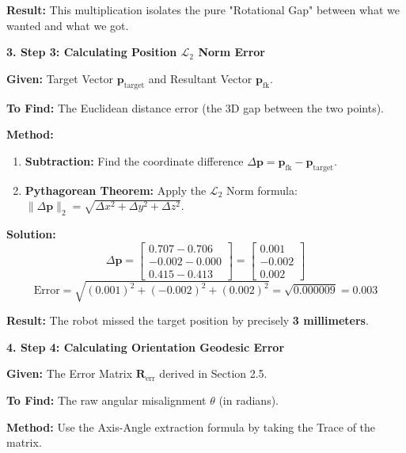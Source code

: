 \documentclass[11pt, a4paper]{article}
\begin{document}
\textbf{Result:} This multiplication isolates the pure "Rotational Gap" between what we wanted and what we got.

\vspace{0.4cm}
\textbf{3. Step 3: Calculating Position $\mathcal{L}_2$ Norm Error}

\textbf{Given:} Target Vector $\mathbf{p}_{\text{target}}$ and Resultant Vector $\mathbf{p}_{\text{fk}}$.

\textbf{To Find:} The Euclidean distance error (the 3D gap between the two points).

\textbf{Method:}
\begin{enumerate}
    \item \textbf{Subtraction:} Find the coordinate difference $\Delta \mathbf{p} = \mathbf{p}_{\text{fk}} - \mathbf{p}_{\text{target}}$.
    \item \textbf{Pythagorean Theorem:} Apply the $\mathcal{L}_2$ Norm formula: $\|\Delta \mathbf{p}\|_2 = \sqrt{\Delta x^2 + \Delta y^2 + \Delta z^2}$.
\end{enumerate}

\textbf{Solution:}
\begin{equation*}
    \Delta \mathbf{p} = \begin{bmatrix} 0.707 - 0.706 \\ -0.002 - 0.000 \\ 0.415 - 0.413 \end{bmatrix} = \begin{bmatrix} 0.001 \\ -0.002 \\ 0.002 \end{bmatrix}
\end{equation*}
\begin{equation*}
    \text{Error} = \sqrt{(0.001)^2 + (-0.002)^2 + (0.002)^2} = \sqrt{0.000009} = 0.003
\end{equation*}

\textbf{Result:} The robot missed the target position by precisely \textbf{3 millimeters}.

\vspace{0.6cm}
\textbf{4. Step 4: Calculating Orientation Geodesic Error}

\textbf{Given:} The Error Matrix $\mathbf{R}_{\text{err}}$ derived in Section 2.5.

\textbf{To Find:} The raw angular misalignment $\theta$ (in radians).

\textbf{Method:} Use the Axis-Angle extraction formula by taking the Trace of the matrix.
\end{document}
